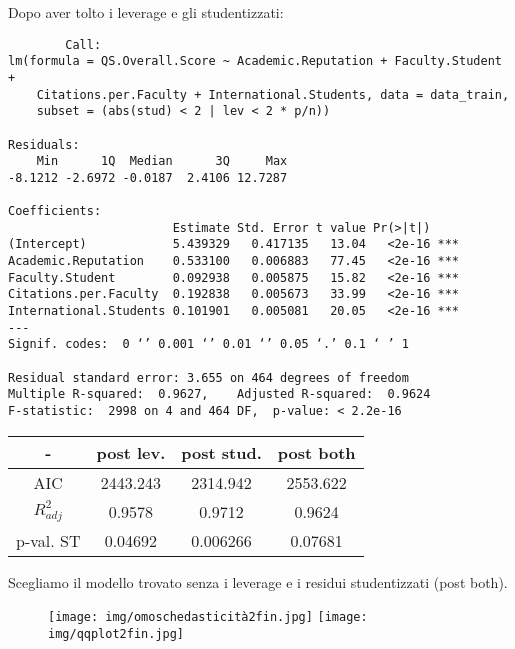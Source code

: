 \documentclass{beamer}
\begin{document}
\begin{frame}[fragile]
    Dopo aver tolto i leverage e gli studentizzati:
    {\tiny
    \begin{verbatim}
        Call:
lm(formula = QS.Overall.Score ~ Academic.Reputation + Faculty.Student + 
    Citations.per.Faculty + International.Students, data = data_train, 
    subset = (abs(stud) < 2 | lev < 2 * p/n))

Residuals:
    Min      1Q  Median      3Q     Max 
-8.1212 -2.6972 -0.0187  2.4106 12.7287 

Coefficients:
                       Estimate Std. Error t value Pr(>|t|)    
(Intercept)            5.439329   0.417135   13.04   <2e-16 ***
Academic.Reputation    0.533100   0.006883   77.45   <2e-16 ***
Faculty.Student        0.092938   0.005875   15.82   <2e-16 ***
Citations.per.Faculty  0.192838   0.005673   33.99   <2e-16 ***
International.Students 0.101901   0.005081   20.05   <2e-16 ***
---
Signif. codes:  0 ‘’ 0.001 ‘’ 0.01 ‘’ 0.05 ‘.’ 0.1 ‘ ’ 1

Residual standard error: 3.655 on 464 degrees of freedom
Multiple R-squared:  0.9627,	Adjusted R-squared:  0.9624 
F-statistic:  2998 on 4 and 464 DF,  p-value: < 2.2e-16
    \end{verbatim}
    }
\end{frame}

\begin{frame}
    \begin{table}[H]
        \begin{center}
            \begin{tabular}{||c c c c||}
                \hline
                - & post lev. & post stud. & post both \\ [0.5ex]
                \hline
                AIC & 2443.243 & 2314.942 & 2553.622 \\
                \hline
                $R^2_{adj}$ & 0.9578 & 0.9712 & 0.9624 \\
                \hline
                p-val. ST & 0.04692 & 0.006266 & 0.07681 \\
                \hline
            \end{tabular}
        \end{center}
    \end{table}
        \vspace*{1cm}
    Scegliamo il modello trovato senza i leverage e i residui studentizzati (post both).
\end{frame}

\begin{frame}
    \begin{figure}
	   \texttt{[image: img/omoschedasticità2fin.jpg]}
	   \hfill
	   \texttt{[image: img/qqplot2fin.jpg]}
	\end{figure}
\end{frame}
\end{document}
